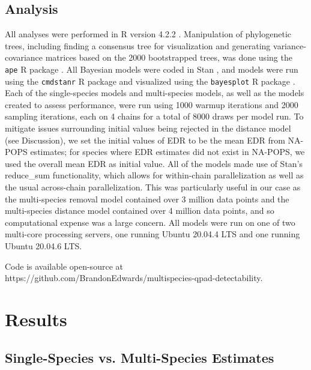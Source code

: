 \subsection{Analysis}
\par All analyses were performed in R version 4.2.2 \citep{r_core_team_r_2022}.
Manipulation of phylogenetic trees, including finding a consensus tree for visualization and generating variance-covariance matrices based on the 2000 bootstrapped trees, was done using the \texttt{ape} R package \citep{paradis_ape_2019}.
All Bayesian models were coded in Stan \cite{stan_development_team_stan_2024}, and models were run using the \texttt{cmdstanr} R package \citep{gabry_cmdstanr_2023} and visualized using the \texttt{bayesplot} R package \citep{gabry_visualization_2019}.
Each of the single-species models and multi-species models, as well as the models created to assess performance, were run using 1000 warmup iterations and 2000 sampling iterations, each on 4 chains for a total of 8000 draws per model run.
To mitigate issues surrounding initial values being rejected in the distance model (see Discussion), we set the initial values of EDR to be the mean EDR from NA-POPS \citep{edwards_point_2023} estimates; for species where EDR estimates did not exist in NA-POPS, we used the overall mean EDR as initial value.
All of the models made use of Stan's reduce\_sum functionality, which allows for within-chain parallelization as well as the usual across-chain parallelization.
This was particularly useful in our case as the multi-species removal model contained over 3 million data points and the multi-species distance model contained over 4 million data points, and so computational expense was a large concern.
All models were run on one of two multi-core processing servers, one running Ubuntu 20.04.4 LTS and one running Ubuntu 20.04.6 LTS.

\par Code is available open-source at https://github.com/BrandonEdwards/multispecies-qpad-detectability.


\section{Results}

\subsection{Single-Species vs. Multi-Species Estimates}

